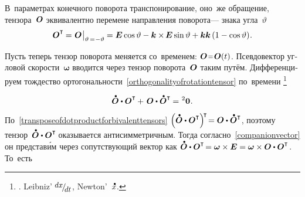 \begin{otherlanguage}{russian}
\vspace{-0.2em}
В~параметрах конечного поворота транспонирование, оно~же обращение, тензора~$\bm{O}$ эквивалентно перемене направления поворота\:--- знака угла~$\vartheta$
\[
\rotationtensor^{\T} \hspace{-0.1ex}=\hspace{.1ex} \rotationtensor \hspace{.1ex} \bigr|_{\vartheta \,=\hspace{.1ex} -\vartheta} \hspace{-0.1ex} = \UnitDyad \operatorname{cos} \vartheta - \bm{k} \times\hspace{-0.2ex} \UnitDyad \operatorname{sin} \vartheta + \bm{k} \bm{k} \left({1 - \operatorname{cos} \vartheta}\right)
\hspace{-0.3ex} .
\]

Пусть теперь тензор поворота меняется со~временем:
${\rotationtensor \narroweq \rotationtensor(t)}$.
Псевдовектор угловой скорости~${\bm{\omega}}$ вводится через тензор поворота~$\bm{O}$ таким путём.
Дифференцируем тождество ортогональности~\eqref{orthogonalityofrotationtensor} по~времени%
\footnote{ .
  Leibniz’ ${\scalebox{.9}{$ \raisemath{.3em}{dx} $} \hspace{-0.3ex} / \hspace{-0.4ex} \scalebox{.9}{$ \raisemath{-.3em}{dt} $}\hspace{.1ex}}$,   Newton’~${\mathdotabove{x}}$.}

\nopagebreak\vspace{-0.1em}\begin{equation*}
\mathdotabove{\rotationtensor} \dotp \rotationtensor^{\T} \hspace{-0.1ex} + \hspace{.25ex} \rotationtensor \dotp \mathdotabove{\rotationtensor}^{\T} \hspace{-0.1ex} = \hspace{.1ex} {^2\bm{0}}
\hspace{.1ex} .
\end{equation*}

По~\eqref{transposeofdotproductforbivalenttensors}
${\left({ \mathdotabove{\rotationtensor} \dotp \rotationtensor^{\T} }\right)^{\raisemath{-0.25em}{\!\T}} \hspace{-0.4ex} = \rotationtensor \dotp \mathdotabove{\rotationtensor}^{\T}}$,
поэтому
тензор~${\mathdotabove{\rotationtensor} \dotp \rotationtensor^{\T\!}}$
оказывается анти\-сим\-метрич\-ным.
Тогда
согласно~\eqref{companionvector}
он представ\'{и}м
через сопутствующий вектор
как
${\mathdotabove{\rotationtensor} \dotp \rotationtensor^{\T\!} = \bm{\omega} \times \UnitDyad = \bm{\omega} \times \rotationtensor \dotp \rotationtensor^{\T}}$\!.
То~есть


\end{otherlanguage}
